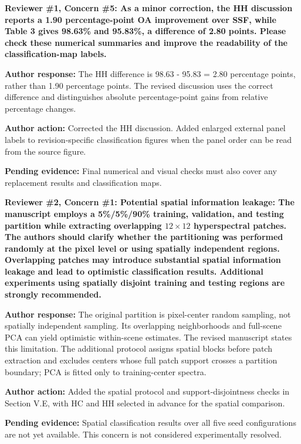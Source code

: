 \documentclass[a4paper,onecolumn,11pt]{IEEEtran}
\newcommand{\pending}[1]{\par\noindent\textcolor{red!70!black}{\textbf{Pending evidence:} #1}\par}
\begin{document}
\vspace{1.5em}
{\color{reviewgreen}\textbf{Reviewer \#1, Concern \#5: As a minor correction, the HH discussion reports a 1.90 percentage-point OA improvement over SSF, while Table 3 gives 98.63\% and 95.83\%, a difference of 2.80 points. Please check these numerical summaries and improve the readability of the classification-map labels. }}

\textbf{Author response:}
The HH difference is 98.63 - 95.83 = 2.80 percentage points, rather than 1.90 percentage points. The revised discussion uses the correct difference and distinguishes absolute percentage-point gains from relative percentage changes.

\textbf{Author action:}
Corrected the HH discussion. Added enlarged external panel labels to revision-specific classification figures when the panel order can be read from the source figure. \pending{Final numerical and visual checks must also cover any replacement results and classification maps.}

\vspace{1.5em}
{\color{reviewgreen}\textbf{Reviewer \#2, Concern \#1: Potential spatial information leakage: The manuscript employs a 5\%/5\%/90\% training, validation, and testing partition while extracting overlapping $12\times12$ hyperspectral patches. The authors should clarify whether the partitioning was performed randomly at the pixel level or using spatially independent regions. Overlapping patches may introduce substantial spatial information leakage and lead to optimistic classification results. Additional experiments using spatially disjoint training and testing regions are strongly recommended. }}

\textbf{Author response:}
The original partition is pixel-center random sampling, not spatially independent sampling. Its overlapping neighborhoods and full-scene PCA can yield optimistic within-scene estimates. The revised manuscript states this limitation. The additional protocol assigns spatial blocks before patch extraction and excludes centers whose full patch support crosses a partition boundary; PCA is fitted only to training-center spectra.

\textbf{Author action:}
Added the spatial protocol and support-disjointness checks in Section V.E, with HC and HH selected in advance for the spatial comparison. \pending{Spatial classification results over all five seed configurations are not yet available. This concern is not considered experimentally resolved.}
\end{document}
